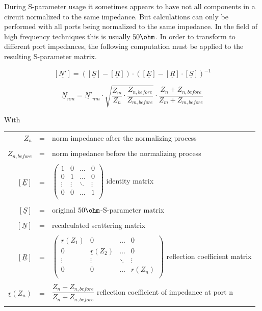\documentclass[10pt]{report}
\begin{document}
During S-parameter usage it sometimes appears to have not all components
in a circuit normalized to the same impedance. But calculations can only
be performed with all ports being normalized to the same impedance. In
the field of high
frequency techniques this is usually $50\ohm$.  In order to transform
to different port impedances, the following computation must be applied
to the resulting S-parameter matrix.

\begin{equation}
\left[\underline{N'}\right] =
\left(\left[\underline{S}\right] - \left[\underline{R}\right]\right) \cdot
\left(\left[\underline{E}\right] - \left[\underline{R}\right] \cdot \left[\underline{S}\right]\right)^{-1}
\end{equation}

\begin{equation}
\underline{N}_{nm} = \underline{N'}_{nm}\cdot \sqrt{\dfrac{Z_m}{Z_n}\cdot
\dfrac{Z_{n,before}}{Z_{m,before}}}\cdot
\dfrac{Z_n + Z_{n,before}}{Z_m + Z_{m,before}}
\end{equation}

With

\addvspace{12pt}

\begin{tabular}{rll}
$Z_{n}$ & = & norm impedance after the normalizing process\\& &\\
$Z_{n,before}$ & = & norm impedance before the normalizing process\\& &\\
$\left[\underline{E}\right]$ & = &
$\begin{pmatrix}
1 & 0 & \ldots & 0\\
0 & 1 & \ldots & 0\\
\vdots & \vdots & \ddots & \vdots\\
0 & 0 & \ldots & 1\\
\end{pmatrix}$
identity matrix\\& &\\
$\left[\underline{S}\right]$ & = & original $50\ohm$-S-parameter matrix\\& &\\
$\left[\underline{N}\right]$ & = & recalculated scattering matrix\\& &\\
$\left[\underline{R}\right]$ & = &
$\begin{pmatrix}
\underline{r}(Z_{1}) & 0 & \ldots & 0\\
0 & \underline{r}(Z_{2}) & \ldots & 0\\
\vdots & \vdots & \ddots & \vdots\\
0 & 0 & \ldots & \underline{r}(Z_{n})\\
\end{pmatrix}$
reflection coefficient matrix\\& &\\
$\underline{r}(Z_{n})$ & = &
$\dfrac{Z_{n} - Z_{n,before}}{Z_{n} + Z_{n,before}}$
reflection coefficient of impedance at port n\\& &\\
\end{tabular}
\end{document}
